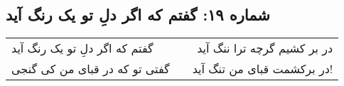 \begin{center}
\section*{شماره ۱۹: گفتم که اگر دلِ تو یک رنگ آید}
\label{sec:019}
\begin{longtable}{l p{0.5cm} r}
گفتم که اگر دلِ تو یک رنگ آید
&&
در بر کشیم گرچه ترا ننگ آید
\\
گفتی تو که در قبای من کی گنجی
&&
در برکشمت قبای من تنگ آید!
\\
\end{longtable}
\end{center}
